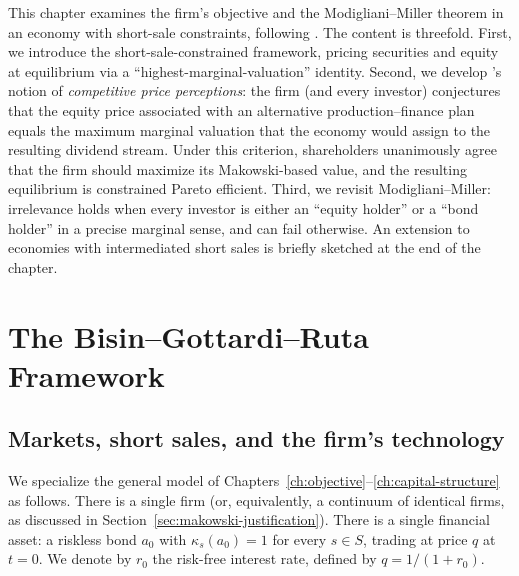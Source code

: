 \documentclass[11pt,a4paper,oneside]{book}
\theoremstyle{plain}
\theoremstyle{definition}
\theoremstyle{remark}
\numberwithin{equation}{chapter}
\begin{document}
This chapter examines the firm's objective and the Modigliani--Miller theorem in an economy with short-sale constraints, following \citet{BisinGottardiRuta2014}.
The content is threefold.
First, we introduce the short-sale-constrained framework, pricing securities and equity at equilibrium via a ``highest-marginal-valuation'' identity.
Second, we develop \citet{Makowski1983b}'s notion of \emph{competitive price perceptions}: the firm (and every investor) conjectures that the equity price associated with an alternative production--finance plan equals the maximum marginal valuation that the economy would assign to the resulting dividend stream.
Under this criterion, shareholders unanimously agree that the firm should maximize its Makowski-based value, and the resulting equilibrium is constrained Pareto efficient.
Third, we revisit Modigliani--Miller: irrelevance holds when every investor is either an ``equity holder'' or a ``bond holder'' in a precise marginal sense, and can fail otherwise.
An extension to economies with intermediated short sales is briefly sketched at the end of the chapter.

\section{The Bisin--Gottardi--Ruta Framework}
\label{sec:bgr-setup}

\subsection{Markets, short sales, and the firm's technology}

We specialize the general model of Chapters~\ref{ch:objective}--\ref{ch:capital-structure} as follows.
There is a single firm (or, equivalently, a continuum of identical firms, as discussed in Section~\ref{sec:makowski-justification}).
There is a single financial asset: a riskless bond $a_0$ with $\kappa_s(a_0) = 1$ for every $s \in S$, trading at price $q$ at $t=0$.
We denote by $r_0$ the risk-free interest rate, defined by $q = 1/(1 + r_0)$.
\end{document}

